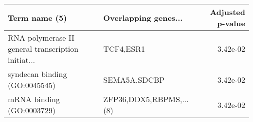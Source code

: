 \begin{tabular}{llr}
\toprule
                                     Term name (5) &    Overlapping genes... &  Adjusted p-value \\
\midrule
RNA polymerase II general transcription initiat... &               TCF4,ESR1 &          3.42e-02 \\
                     syndecan binding (GO:0045545) &            SEMA5A,SDCBP &          3.42e-02 \\
                         mRNA binding (GO:0003729) & ZFP36,DDX5,RBPMS,...(8) &          3.42e-02 \\
\bottomrule
\end{tabular}
